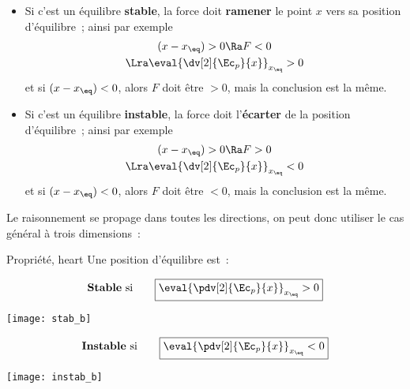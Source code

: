 \documentclass[../main/main.tex]{subfiles}
\begin{document}
\begin{itemize}
    \item Si c'est un équilibre \textbf{stable}, la force doit \textbf{ramener}
        le point $x$ vers sa position d'équilibre~; ainsi par exemple
        \begin{gather*}
            (x-x_{\eq}) > 0 \Ra F < 0
            \\\Lra
            \eval{\dv[2]{\Ec_p}{x}}_{x_{\eq}} > 0
        \end{gather*}
        et si $(x-x_{\eq}) < 0$, alors $F$ doit être $>0$, mais la conclusion
        est la même.
    \item Si c'est un équilibre \textbf{instable}, la force doit
        l'\textbf{écarter} de la position d'équilibre~; ainsi par exemple
        \begin{gather*}
            (x-x_{\eq}) > 0 \Ra F > 0
            \\\Lra
            \eval{\dv[2]{\Ec_p}{x}}_{x_{\eq}} < 0
        \end{gather*}
        et si $(x-x_{\eq}) < 0$, alors $F$ doit être $<0$, mais la conclusion
        est la même.
\end{itemize}

Le raisonnement se propage dans toutes les directions, on peut donc utiliser le
cas général à trois dimensions~:

\begin{tprop}{Propriété, heart}
    Une position d'équilibre est~:\\
    \begin{rsideprop}
        \[\text{\textbf{Stable} si}
        \qquad
        \boxed{\eval{\pdv[2]{\Ec_p}{x}}_{x_{\eq}} > 0}\]
        \begin{center}
            \texttt{[image: stab\_b]}
        \end{center}
        \tcblower
        \[\text{\textbf{Instable} si}
        \qquad
        \boxed{\eval{\pdv[2]{\Ec_p}{x}}_{x_{\eq}} < 0}\]
        \begin{center}
            \texttt{[image: instab\_b]}
        \end{center}
    \end{rsideprop}
\end{tprop}
\end{document}
